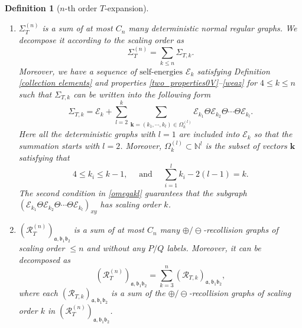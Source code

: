 \documentclass{article}
\newcommand{\1}{\mathds{1}}
\numberwithin{equation}{section}
\newcommand{\be}{\begin{equation}}
\newcommand{\ee}{\end{equation}}
\newcommand{\fa}{{\mathfrak a}}
\newcommand{\fb}{{\mathfrak b}}
\renewcommand{\leq}{\leqslant}
\renewcommand{\le}{\leq}
\newcommand{\N}{\mathbb{N}}
\newcommand{\selfs}{\text{self-energies}}
\theoremstyle{plain} %
\newtheorem{definition}[theorem]{Definition}
\theoremstyle{remark}
\newcommand{\Sdelta}{{\Sigma}_T}
\newcommand{\Sdeltak}{{\Sigma}_{T,k}}
\newcommand{\Sele}{{\mathcal E}}
\newcommand{\Selek}{{\mathcal E}}
\newcommand{\Cele}{{\mathscr E}}
\newcommand{\PTn}{\mathcal R_T^{(n)}}
\newcommand{\PTk}{{\mathcal R_{T,k}}}
\begin{document}
\begin{definition} [$n$-th order $T$-expansion]
\begin{enumerate}
\item $\Sdelta^{(n)}$ is a sum of at most $C_n$ many deterministic normal regular graphs. %
We decompose it according to the scaling order as 
\be\label{decompose Sdelta0} \Sdelta^{(n)} = \sum_{k\le n} \Sdeltak.\ee
Moreover, we have a sequence of $\selfs$ $\Sele_{k}$ satisfying Definition \ref{collection elements} and properties \eqref{two_properties0V}--\eqref{weaz} for $4\le k \le n$ such that $\Sdeltak$ can be written into the following form %
\be\label{chain S2k}
\Sdeltak=\Sele_{k} + \sum_{ l =2}^k \sum\limits_{ \mathbf k=(k_1,\cdots, k_l) \in \Omega_{k}^{(l)} } \Sele_{k_1}\Theta  \Sele_{k_2}\Theta \cdots \Theta  \Sele_{k_l} . %
\ee
Here all the deterministic graphs with $l=1$ are included into $\Sele_k$ so that the summation starts with $l=2$. Moreover,  $\Omega_{k}^{(l)} \subset \N^l$ is the subset of vectors $\mathbf k$ satisfying that 
\be\label{omegakl}
4\le k_i \le k-1,\quad \text{ and }\quad  \sum_{i=1}^l  k_i  -2(l-1)=k. 
\ee
The second condition in \eqref{omegakl} guarantees that the subgraph $(\Sele_{k_1}\Theta  \Sele_{k_2}\Theta \cdots \Theta  \Sele_{k_l})_{xy}$ has scaling order $k$.
 
 
\item $(\PTn)_{\fa,\fb_1\fb_2}$ is a sum of at most $C_n$ many $\oplus/\ominus$-recollision graphs of scaling order $\le n$ and without any $P/Q$ labels.  Moreover, it can be decomposed as 
 \be\label{decomposeP}(\PTn)_{\fa,\fb_1\fb_2} =\sum_{ k =3}^{ n}(\PTk)_{\fa,\fb_1\fb_2},\ee
 where each $(\PTk)_{\fa,\fb_1\fb_2}$ is a sum of the $\oplus/\ominus$-recollision graphs of scaling order $k$ in $(\PTn)_{\fa,\fb_1\fb_2}$. 



\end{enumerate}
\end{definition}
\end{document}
